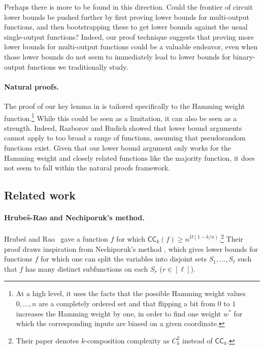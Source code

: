 \documentclass[10pt,a4paper]{article}
\theoremstyle{definition}
\theoremstyle{remark}
\newcommand{\myw}{{w^*}}
\newcommand{\CC}{\mathsf{CC}}
\begin{document}
Perhaps there is more to be found in this direction.
Could the frontier of circuit lower bounds be pushed further by first proving lower bounds for multi-output functions, and then bootstrapping these to get lower bounds against the usual single-output functions?
Indeed, our proof technique suggests that proving more lower bounds for multi-output functions could be a valuable endeavor, even when those lower bounds do not seem to immediately lead to lower bounds for binary-output functions we traditionally study.





\paragraph*{Natural proofs.}
The proof of our key lemma in  is tailored specifically to the Hamming weight function.\footnote{At a high level, it uses the facts that the possible Hamming weight values $0, \ldots, n$ are a completely ordered set
and that flipping a bit from $0$ to $1$ increases the Hamming weight by one,
in order to find one weight $\myw$ for which the corresponding inputs are biased on a given coordinate.}
While this could be seen as a limitation, it can also be seen as a strength.
Indeed, Razborov and Rudich \cite{RR97} showed that lower bound arguments
cannot apply to too broad a range of functions, assuming that pseudorandom functions exist.
Given that our lower bound argument only works for the Hamming weight and closely related functions like the majority function, it does not seem to fall within the natural proofs framework.








\subsection{Related work}\label{sec:related}

\paragraph*{Hrube\v{s}-Rao and Nechiporuk's method.}
Hrubeš and Rao~\cite{HR15} gave a function $f$ for which
$\CC_k(f) \geq n^{\Omega(1 - k/n)}$.\footnote{Their paper denotes $k$-composition complexity as $C^2_k$ instead of $\CC_k$.}
Their proof draws inspiration from Nechiporuk's method \cite{Nec66},
which gives lower bounds for functions $f$ for which one
can split the variables into disjoint sets $S_1, \ldots, S_\ell$ 
such that $f$ has many distinct subfunctions on each $S_r$ ($r \in [\ell]$).
\end{document}
